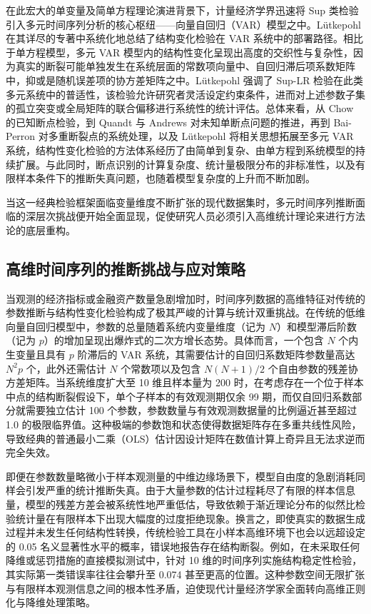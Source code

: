 在此宏大的单变量及简单方程理论演进背景下，计量经济学界迅速将 Sup 类检验引入多元时间序列分析的核心枢纽——向量自回归（VAR）模型之中。L{\"u}tkepohl 在其详尽的专著中系统化地总结了结构变化检验在 VAR 系统中的部署路径。相比于单方程模型，多元 VAR 模型内的结构性变化呈现出高度的交织性与复杂性，因为真实的断裂可能单独发生在系统层面的常数项向量中、自回归滞后项系数矩阵中，抑或是随机误差项的协方差矩阵之中。L{\"u}tkepohl 强调了 Sup-LR 检验在此类多元系统中的普适性，该检验允许研究者灵活设定约束条件，进而对上述参数子集的孤立突变或全局矩阵的联合偏移进行系统性的统计评估。总体来看，从 Chow 的已知断点检验，到 Quandt 与 Andrews 对未知单断点问题的推进，再到 Bai-Perron 对多重断裂点的系统处理，以及 L{\"u}tkepohl 将相关思想拓展至多元 VAR 系统，结构性变化检验的方法体系经历了由简单到复杂、由单方程到系统模型的持续扩展。与此同时，断点识别的计算复杂度、统计量极限分布的非标准性，以及有限样本条件下的推断失真问题，也随着模型复杂度的上升而不断加剧。


当这一经典检验框架面临变量维度不断扩张的现代数据集时，多元时间序列推断面临的深层次挑战便开始全面显现，促使研究人员必须引入高维统计理论来进行方法论的底层重构。

\subsection{高维时间序列的推断挑战与应对策略}

当观测的经济指标或金融资产数量急剧增加时，时间序列数据的高维特征对传统的参数推断与结构性变化检验构成了极其严峻的计算与统计双重挑战。在传统的低维向量自回归模型中，参数的总量随着系统内变量维度（记为 $N$）和模型滞后阶数（记为 $p$）的增加呈现出爆炸式的二次方增长态势。具体而言，一个包含 $N$ 个内生变量且具有 $p$ 阶滞后的 VAR 系统，其需要估计的自回归系数矩阵参数量高达 $N^2p$ 个，此外还需估计 $N$ 个常数项以及包含 $N(N+1)/2$ 个自由参数的残差协方差矩阵。当系统维度扩大至 10 维且样本量为 200 时，在考虑存在一个位于样本中点的结构断裂假设下，单个子样本的有效观测期仅余 99 期，而仅自回归系数部分就需要独立估计 100 个参数，参数数量与有效观测数据量的比例逼近甚至超过 1.0 的极限临界值。这种极端的参数饱和状态使得数据矩阵存在多重共线性风险，导致经典的普通最小二乘（OLS）估计因设计矩阵在数值计算上奇异且无法求逆而完全失效。

即便在参数数量略微小于样本观测量的中维边缘场景下，模型自由度的急剧消耗同样会引发严重的统计推断失真。由于大量参数的估计过程耗尽了有限的样本信息量，模型的残差方差会被系统性地严重低估，导致依赖于渐近理论分布的似然比检验统计量在有限样本下出现大幅度的过度拒绝现象。换言之，即使真实的数据生成过程并未发生任何结构性转换，传统检验工具在小样本高维环境下也会以远超设定的 0.05 名义显著性水平的概率，错误地报告存在结构断裂。例如，在未采取任何降维或惩罚措施的直接模拟测试中，针对 10 维的时间序列实施结构稳定性检验，其实际第一类错误率往往会攀升至 0.074 甚至更高的位置。这种参数空间无限扩张与有限样本观测信息之间的根本性矛盾，迫使现代计量经济学家全面转向高维正则化与降维处理策略。

